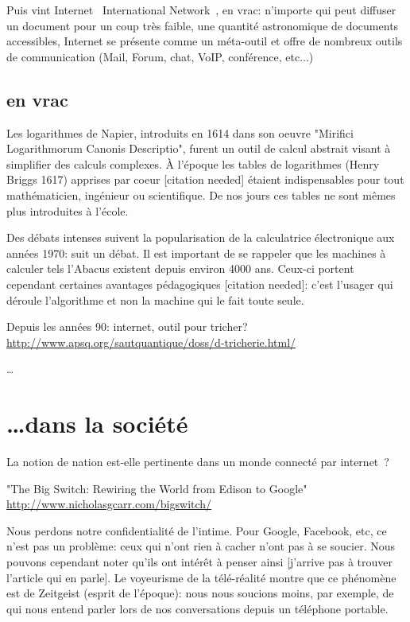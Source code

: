 Puis vint Internet \og{}~International Network~\fg{}, en vrac: n'importe qui
peut diffuser un document pour un coup très faible, une quantité astronomique
de documents accessibles, Internet se présente comme un méta-outil et offre de
nombreux outils de communication (Mail, Forum, chat, VoIP, conférence, etc...)

\subsection{en vrac}

Les logarithmes de Napier, introduits en 1614 dans son oeuvre
"Mirifici Logarithmorum Canonis Descriptio", furent un outil de calcul
abstrait visant à simplifier des calculs complexes. À l'époque les
tables de logarithmes (Henry Briggs 1617) apprises par coeur [citation
  needed] étaient indispensables pour tout mathématicien, ingénieur ou
scientifique. De nos jours ces tables ne sont mêmes plus introduites à
l'école.

Des débats intenses suivent la popularisation de la calculatrice électronique 
aux années 1970: suit un débat. Il est important de se rappeler que les 
machines à calculer tels l'Abacus existent depuis environ 4000 ans. Ceux-ci 
portent cependant certaines avantages pédagogiques [citation needed]: c'est 
l'usager qui déroule l'algorithme et non la machine qui le fait toute seule. 

Depuis les années 90: internet, outil pour tricher?
\url{http://www.apsq.org/sautquantique/doss/d-tricherie.html/}

\ldots

\section{\ldots dans la société}

La notion de nation est-elle pertinente dans un monde connecté par
internet~?

"The Big Switch: Rewiring the World from Edison to Google" 
 \url{http://www.nicholasgcarr.com/bigswitch/}

Nous perdons notre confidentialité de l'intime. Pour Google, Facebook, etc, 
ce n'est pas un problème: ceux qui n'ont rien à cacher n'ont pas à se soucier. Nous
pouvons cependant noter qu'ils ont intérêt à penser ainsi [j'arrive pas à 
trouver l'article qui en parle]. Le voyeurisme de la télé-réalité montre 
que ce phénomène est de Zeitgeist (esprit de l'époque): nous nous soucions 
moins, par exemple, de qui nous entend parler lors de nos
conversations depuis un téléphone portable.

